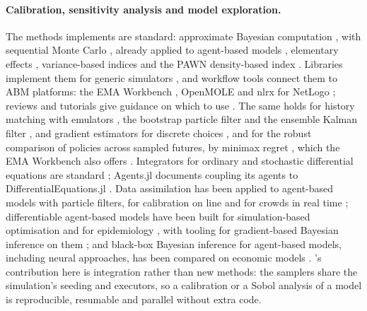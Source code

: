 \paragraph{Calibration, sensitivity analysis and model exploration.} The methods \modelly{}
implements are standard: approximate Bayesian computation \citep{beaumont2002approximate}, with sequential Monte
Carlo \citep{sisson2007sequential, toni2009approximate, beaumont2009adaptive}, already applied to
agent-based models \citep{vandervaart2015calibration, platt2020comparison}, elementary effects
\citep{morris1991factorial}, variance-based indices \citep{sobol2001global, saltelli2010variance,
jansen1999analysis} and the PAWN density-based index \citep{pianosi2015simple,
pianosi2018distribution}. Libraries implement them for generic simulators
\citep{herman2017salib, iwanaga2022salib, klinger2018pyabc, schalte2022pyabc}, and workflow
tools connect them to ABM platforms: the EMA Workbench \citep{kwakkel2017ema}, OpenMOLE
\citep{reuillon2013openmole} and nlrx for NetLogo \citep{salecker2019nlrx}; reviews and tutorials give
guidance on which to use \citep{thiele2014facilitating, tenbroeke2016which, hartig2011statistical,
lee2015complexities}. The same holds for history matching with emulators
\citep{vernon2010galaxy, andrianakis2015bayesian}, the bootstrap particle filter
\citep{gordon1993novel} and the ensemble Kalman filter \citep{evensen2003ensemble}, and
gradient estimators for discrete choices \citep{bengio2013estimating, jang2017categorical},
and for the robust comparison of policies across sampled futures, by minimax regret
\citep{savage1951theory}, which the EMA Workbench also offers \citep{kwakkel2017ema}.
Integrators for ordinary and stochastic differential equations are standard
\citep{virtanen2020scipy, kloeden1992numerical}; Agents.jl documents coupling its agents to
DifferentialEquations.jl \citep{datseris2024agents}.
Data assimilation has been applied to agent-based models with particle filters, for
calibration on line and for crowds in real time \citep{ward2016dynamic, malleson2020simulating};
differentiable agent-based models have been built for simulation-based optimisation and for
epidemiology \citep{andelfinger2021differentiable, chopra2023differentiable}, with tooling for
gradient-based Bayesian inference on them \citep{querabofarull2023blackbirds}; and black-box
Bayesian inference for agent-based models, including neural approaches, has been compared on
economic models \citep{dyer2024blackbox}. \modelly{}'s contribution here is integration rather
than new methods:
the samplers share the simulation's seeding and executors, so a calibration or a Sobol analysis
of a model is reproducible, resumable and parallel without extra code.

